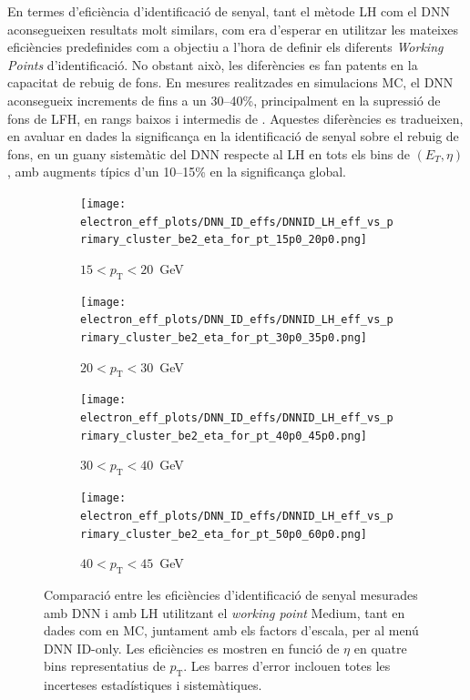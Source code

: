 En termes d’eficiència d’identificació de senyal, tant el mètode LH com el DNN aconsegueixen resultats molt similars, com era d’esperar en utilitzar les mateixes eficiències predefinides com a objectiu a l’hora de definir els diferents \textit{Working Points} d’identificació.  
No obstant això, les diferències es fan patents en la capacitat de rebuig de fons.  
En mesures realitzades en simulacions MC, el DNN aconsegueix increments de fins a un 30–40\%, principalment en la supressió de fons de LFH, en rangs baixos i intermedis de \et.  
Aquestes diferències es tradueixen, en avaluar en dades la significança en la identificació de senyal sobre el rebuig de fons, en un guany sistemàtic del DNN respecte al LH en tots els bins de $(E_T,\eta)$, amb augments típics d’un 10–15\% en la significança global.
\begin{figure}[h]
  \centering

  \begin{subfigure}[b]{0.48\textwidth}
    \centering
    \texttt{[image: electron\_eff\_plots/DNN\_ID\_effs/DNNID\_LH\_eff\_vs\_primary\_cluster\_be2\_eta\_for\_pt\_15p0\_20p0.png]}
    \caption{$15 < p_{\mathrm{T}} < 20$~GeV}
    \label{res:eff_dnn_lh_ptbin1}
  \end{subfigure}
  \hfill
  \begin{subfigure}[b]{0.48\textwidth}
    \centering
    \texttt{[image: electron\_eff\_plots/DNN\_ID\_effs/DNNID\_LH\_eff\_vs\_primary\_cluster\_be2\_eta\_for\_pt\_30p0\_35p0.png]}
    \caption{$20 < p_{\mathrm{T}} < 30$~GeV}
    \label{res:eff_dnn_lh_ptbin2}
  \end{subfigure}

  \vspace{0.5cm}

  \begin{subfigure}[b]{0.48\textwidth}
    \centering
    \texttt{[image: electron\_eff\_plots/DNN\_ID\_effs/DNNID\_LH\_eff\_vs\_primary\_cluster\_be2\_eta\_for\_pt\_40p0\_45p0.png]}
    \caption{$30 < p_{\mathrm{T}} < 40$~GeV}
    \label{res:eff_dnn_lh_ptbin3}
  \end{subfigure}
  \hfill
  \begin{subfigure}[b]{0.48\textwidth}
    \centering
    \texttt{[image: electron\_eff\_plots/DNN\_ID\_effs/DNNID\_LH\_eff\_vs\_primary\_cluster\_be2\_eta\_for\_pt\_50p0\_60p0.png]}
    \caption{$40 < p_{\mathrm{T}} < 45$~GeV}
    \label{res:eff_dnn_lh_ptbin4}
  \end{subfigure}

  \caption{
    Comparació entre les eficiències d’identificació de senyal mesurades amb DNN i amb LH utilitzant el \textit{working point} Medium, 
    tant en dades com en MC, juntament amb els factors d’escala, per al menú DNN ID-only.  
    Les eficiències es mostren en funció de $\eta$ en quatre bins representatius de $p_{\mathrm{T}}$.  
    Les barres d’error inclouen totes les incerteses estadístiques i sistemàtiques.}

  \label{res:eff_sfs_dnn_vs_lh_eta_4ptbins}
\end{figure}


